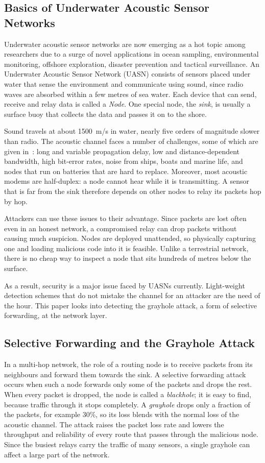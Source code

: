 \documentclass[conference]{IEEEtran}
\begin{document}
\subsection{Basics of Underwater Acoustic Sensor Networks}
Underwater acoustic sensor networks are now emerging as a hot topic among researchers due to a surge of novel applications in ocean sampling, environmental monitoring, offshore exploration, disaster prevention and tactical surveillance. An Underwater Acoustic Sensor Network (UASN) consists of sensors placed under water that sense the environment and communicate using sound, since radio waves are absorbed within a few metres of sea water. Each device that can send, receive and relay data is called a \emph{Node}. One special node, the \emph{sink}, is usually a surface buoy that collects the data and passes it on to the shore.

Sound travels at about 1500~m/s in water, nearly five orders of magnitude slower than radio. The acoustic channel faces a number of challenges, some of which are given in~\cite{akyildiz}: long and variable propagation delay, low and distance-dependent bandwidth, high bit-error rates, noise from ships, boats and marine life, and nodes that run on batteries that are hard to replace. Moreover, most acoustic modems are half-duplex: a node cannot hear while it is transmitting. A sensor that is far from the sink therefore depends on other nodes to relay its packets hop by hop.

Attackers can use these issues to their advantage. Since packets are lost often even in an honest network, a compromised relay can drop packets without causing much suspicion. Nodes are deployed unattended, so physically capturing one and loading malicious code into it is feasible. Unlike a terrestrial network, there is no cheap way to inspect a node that sits hundreds of metres below the surface.

As a result, security is a major issue faced by UASNs currently. Light-weight detection schemes that do not mistake the channel for an attacker are the need of the hour. This paper looks into detecting the grayhole attack, a form of selective forwarding, at the network layer.

\subsection{Selective Forwarding and the Grayhole Attack}
In a multi-hop network, the role of a routing node is to receive packets from its neighbours and forward them towards the sink. A selective forwarding attack~\cite{karlof} occurs when such a node forwards only some of the packets and drops the rest. When every packet is dropped, the node is called a \emph{blackhole}; it is easy to find, because traffic through it stops completely. A \emph{grayhole} drops only a fraction of the packets, for example 30\%, so its loss blends with the normal loss of the acoustic channel. The attack raises the packet loss rate and lowers the throughput and reliability of every route that passes through the malicious node. Since the busiest relays carry the traffic of many sensors, a single grayhole can affect a large part of the network.
\end{document}
